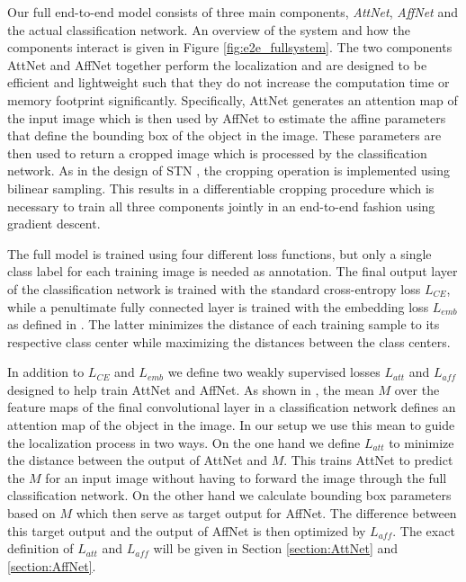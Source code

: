 \documentclass{bmvc2k}
\begin{document}
Our full end-to-end model consists of three main components, \emph{AttNet}, \emph{AffNet} and the actual classification network. An overview of the system and how the components interact is given in Figure \ref{fig:e2e_fullsystem}. The two components AttNet and AffNet together perform the localization and are designed to be efficient and lightweight such that they do not increase the computation time or memory footprint significantly. Specifically, AttNet generates an attention map of the input image which is then used by AffNet to estimate the affine parameters that define the bounding box of the object in the image. These parameters are then used to return a cropped image which is processed by the classification network. As in the design of STN \cite{jaderberg2015spatial}, the cropping operation is implemented using bilinear sampling. This results in a differentiable cropping procedure which is necessary to train all three components jointly in an end-to-end fashion using gradient descent. 

The full model is trained using four different loss functions, but only a single class label for each training image is needed as annotation. The final output layer of the classification network is trained with the standard cross-entropy loss $L_{CE}$, while a penultimate fully connected layer is trained with the embedding loss $L_{emb}$ as defined in \cite{Hanselmann_2020_WACV}. The latter minimizes the distance of each training sample to its respective class center while maximizing the distances between the class centers. 

In addition to $L_{CE}$ and $L_{emb}$ we define two weakly supervised losses $L_{att}$ and $L_{aff}$ designed to help train AttNet and AffNet. As shown in \cite{zhou2016learning}, the mean $M$ over the feature maps of the final convolutional layer in a classification network defines an attention map of the object in the image. In our setup we use this mean to guide the localization process in two ways. On the one hand we define $L_{att}$ to minimize the distance between the output of AttNet and $M$. This trains AttNet to predict the $M$ for an input image without having to forward the image through the full classification network. On the other hand we calculate bounding box parameters based on $M$ which then serve as target output for AffNet. The difference between this target output and the output of AffNet is then optimized by $L_{aff}$. The exact definition of $L_{att}$ and $L_{aff}$ will be given in Section \ref{section:AttNet} and \ref{section:AffNet}. 
\end{document}
